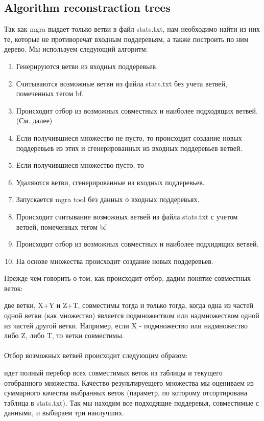 \documentclass{article}
\begin{document}
\subsection{Algorithm reconstraction trees}
Так как mgra выдает только ветви в файл stats.txt, нам необходимо найти из них те,
 которые не противоречат входным поддеревьям, а также построить по ним дерево. Мы используем следующий алгоритм: 
\begin{enumerate}
	\item Генерируются
 ветви из входных поддеревьев. 
	\item Считываются возможные ветви из файла stats.txt без учета ветвей, помеченных тегом bf. 
	\item Происходит отбор из 
возможных совместных и наиболее подходящих ветвей. (См. далее)
	\item Если получившиеся множество не пусто, то происходит создание новых поддеревьев 
из этих и сгенерированных из входных поддеревьев ветвей. 
	\item Если получившиеся множество пусто, то 
	\item Удаляются ветви, сгенерированные из
 входных поддеревьев. 
	\item Запускается mgra tool без данных о входных поддеревьях. 
	\item Происходит считывание возможных ветвей из файла stats.txt
 с учетом ветвей, помеченных тегом bf
	\item Происходит отбор из возможных совместных и наиболее подхидящих ветвей. 	
\item На основе множества происходит создание новых поддеревьев.  
\end{enumerate}
Прежде чем говорить о том, как происходит отбор, дадим понятие 
совместных веток: 

две ветки, X+Y и Z+T, совместимы тогда и только тогда, когда одна из частей одной ветки (как множество) является подмножеством или 
надмножеством одной из частей другой ветки. Например, если X - подмножество или
 надмножество либо Z, либо T, то ветки совместимы. \\
\\
Отбор возможных ветвей происходит следующим образом: 

идет полный перебор 
 всех совместимых веток из таблицы и текущего отобранного множества. Качество результируещего множества мы оцениваем из суммарного качества 
выбранных веток (параметр, по которому отсортирована таблица в stats.txt). Так мы находим все подходящие поддеревья, совместимые с данными, и выбираем три
наилучших.  
\end{document}
